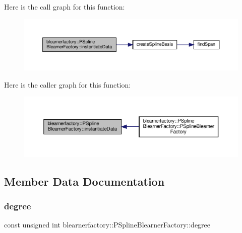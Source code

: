 Here is the call graph for this function\+:\nopagebreak
\begin{figure}[H]
\begin{center}
\leavevmode
\includegraphics[width=350pt]{classblearnerfactory_1_1_p_spline_blearner_factory_a290a1c60224d027059939a895b474aa1_cgraph}
\end{center}
\end{figure}
Here is the caller graph for this function\+:\nopagebreak
\begin{figure}[H]
\begin{center}
\leavevmode
\includegraphics[width=350pt]{classblearnerfactory_1_1_p_spline_blearner_factory_a290a1c60224d027059939a895b474aa1_icgraph}
\end{center}
\end{figure}


\subsection{Member Data Documentation}
\mbox{\label{classblearnerfactory_1_1_p_spline_blearner_factory_a8cfdf9e919e6392b2cba293dd5d931d5}} 
\subsubsection{\texorpdfstring{degree}{degree}}
{\footnotesize\ttfamily const unsigned int blearnerfactory\+::\+P\+Spline\+Blearner\+Factory\+::degree\hspace{0.3cm}{\ttfamily [private]}}



